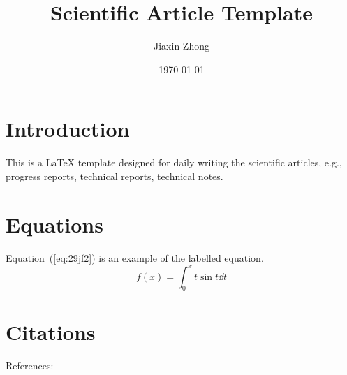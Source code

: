 \documentclass{article}
\title{Scientific Article Template}
\author{Jiaxin Zhong}
\date{\today}
\begin{document}
\maketitle
\thispagestyle{firststyle}

\section{Introduction}
This is a \LaTeX{} template designed for daily writing the scientific articles, e.g., progress reports, technical reports, technical notes.


\lipsum[1]

\lipsum[2]

\lipsum[3]

\lipsum[4]

\lipsum[5]

\lipsum[6]

\section{Equations}
Equation~(\ref{eq:29jf2}) is an example of the labelled equation.
\begin{equation}
    f(x) = \int_0^x t\sin t \dd t
    \label{eq:29jf2}
\end{equation}

\section{Citations}
References: \cite{Zhong2020InsertionLossThin}





\end{document}
